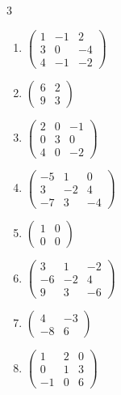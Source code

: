 \begin{multicols}{3}
\begin{enumerate}[label=\arabic*.,  leftmargin=*]
\item $\begin{pmatrix}1&-1&2\\3&0&-4\\4&-1&-2\end{pmatrix}$
\item $\begin{pmatrix}6&2\\9&3\end{pmatrix}$
\item $\begin{pmatrix}2&0&-1\\0&3&0\\4&0&-2\end{pmatrix}$
\item $\begin{pmatrix}-5&1&0\\3&-2&4\\-7&3&-4\end{pmatrix}$
\item $\begin{pmatrix}1&0\\0&0\end{pmatrix}$
\item $\begin{pmatrix}3&1&-2\\-6&-2&4\\9&3&-6\end{pmatrix}$
\item $\begin{pmatrix}4&-3\\-8&6\end{pmatrix}$
\item $\begin{pmatrix}1&2&0\\0&1&3\\-1&0&6\end{pmatrix}$
\end{enumerate}
\end{multicols}

